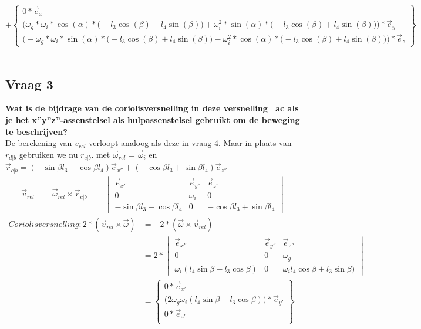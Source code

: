 \documentclass[a4paper,10pt]{article}
\begin{document}
\begin{equation}
	+ \begin{Bmatrix}
		{0*\vec{e}_{x}}\\
		\Big(\omega_g * \omega_i*\cos(\alpha)*\Big( - l_3 \cos(\beta) + l_4 \sin(\beta)\Big) + \omega_i^2*\sin(\alpha)*\Big( - l_3 \cos(\beta) + l_4 \sin(\beta)\Big)\Big) *\vec{e}_{y}\\
		\Big(-\omega_g * \omega_i*\sin(\alpha)*\Big( - l_3 \cos(\beta) + l_4 \sin(\beta)\Big) - \omega_i^2*\cos(\alpha)*\Big( - l_3 \cos(\beta) + l_4 \sin(\beta)\Big)\Big)*\vec{e}_{z} 
	\end{Bmatrix}
\end{equation}\\		

\subsection{Vraag 3}
\textbf{Wat is de bijdrage van de coriolisversnelling in deze versnelling ~ac als je het x”y”z”-assenstelsel als hulpassenstelsel gebruikt om de beweging te beschrijven?}\\
De berekening van $v_{rel}$ verloopt analoog als deze in vraag 4. Maar in plaats van $r_{d|b}$ gebruiken we nu $r_{c|b}$.
met $\vec{\omega}_{rel}$ = $\vec{\omega}_i$ en $\vec{r}_{c|b} = (-\sin{\beta}l_3 - \cos{\beta} l_4)\vec{e}_{x''} + (-\cos{\beta} l_3 + \sin{\beta}l_4)\vec{e}_{z''}$
\begin{equation}
\begin{aligned}
\vec{v}_{rel} &= \vec{\omega}_{rel} \times \vec{r}_{c|b}
&=\begin{vmatrix}
\vec{e}_{x''} & \vec{e}_{y''} & \vec{e}_{z''}\\
0 & \omega_i & 0\\
-\sin{\beta}l_3 - \cos{\beta} l_4 & 0 &-\cos{\beta} l_3 + \sin{\beta} l_4
\end{vmatrix}
\end{aligned}
\end{equation}
\begin{equation}
\begin{aligned}
	Coriolisversnelling: 2*( \vec{v}_{rel} \times  \vec{\omega}) &= -2 *( \vec{\omega} \times \vec{v}_{rel})\\
	&=2 * \begin{vmatrix}
	\vec{e}_{x''} & \vec{e}_{y''} & \vec{e}_{z''}\\
	0 & 0 & \omega_g \\
	\omega_i  (l_4 \sin{\beta}-l_3  \cos{\beta}) & 0 & \omega_i l_4\cos{\beta} + l_3  \sin{\beta})
	\end{vmatrix}\\
	&= \begin{Bmatrix}
	0 * \vec{e}_{x'}\\
	\Big(2\omega_g\omega_i(l_4 \sin{\beta}-l_3  \cos{\beta})\Big)*\vec{e}_{y'}\\
	0 * \vec{e}_{z'}\\
	\end{Bmatrix}
\end{aligned}
\end{equation}
\end{document}
